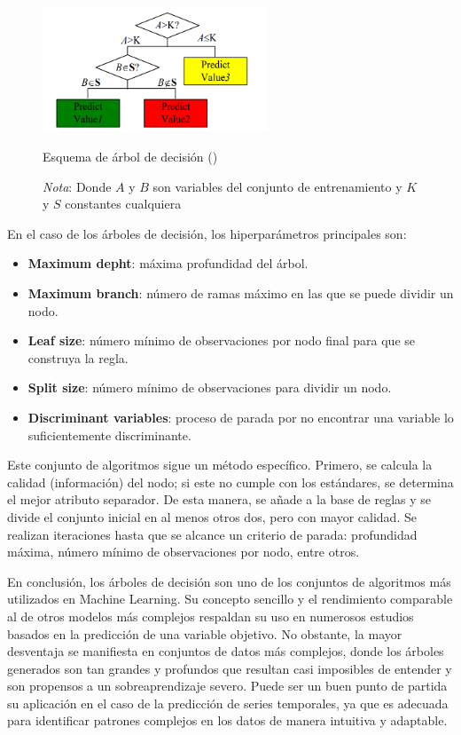 \documentclass[12pt,a4paper]{report}
\begin{document}
\begin{figure}[H]
    \centering
    \includegraphics[width=0.6\textwidth]{Images/tfm-2.5.png}
    \caption{Esquema de árbol de decisión (\cite{liu2013overview})}
    \caption*{\textit{Nota}: Donde $A$ y $B$ son variables del conjunto de entrenamiento y $K$ y $S$ constantes cualquiera}
    \label{fig:DT}
\end{figure}

En el caso de los árboles de decisión, los hiperparámetros principales son:

\begin{itemize}
    \item \textbf{Maximum depht}: máxima profundidad del árbol.

    \item \textbf{Maximum branch}: número de ramas máximo en las que se puede dividir un nodo.

    \item \textbf{Leaf size}: número mínimo de observaciones por nodo final para que se construya la regla.

    \item \textbf{Split size}: número mínimo de observaciones para dividir un nodo.

    \item \textbf{Discriminant variables}: proceso de parada por no encontrar una variable lo suficientemente discriminante.
\end{itemize}

Este conjunto de algoritmos sigue un método específico. Primero, se calcula la calidad (información) del nodo; si este no cumple con los estándares, se determina el mejor atributo separador. De esta manera, se añade a la base de reglas y se divide el conjunto inicial en al menos otros dos, pero con mayor calidad. Se realizan iteraciones hasta que se alcance un criterio de parada: profundidad máxima, número mínimo de observaciones por nodo, entre otros.

En conclusión, los árboles de decisión son uno de los conjuntos de algoritmos más utilizados en Machine Learning. Su concepto sencillo y el rendimiento comparable al de otros modelos más complejos respaldan su uso en numerosos estudios basados en la predicción de una variable objetivo. No obstante, la mayor desventaja se manifiesta en conjuntos de datos más complejos, donde los árboles generados son tan grandes y profundos que resultan casi imposibles de entender y son propensos a un sobreaprendizaje severo. Puede ser un buen punto de partida su aplicación en el caso de la predicción de series temporales, ya que es adecuada para identificar patrones complejos en los datos de manera intuitiva y adaptable.
\end{document}
